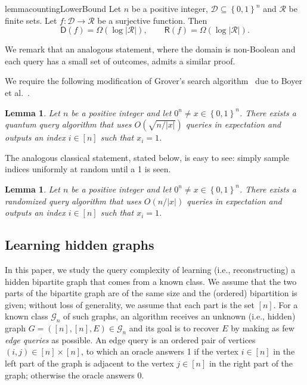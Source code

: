 \documentclass[11pt]{article}
\newcommand{\cD}{\mathcal{D}}
\newcommand{\cG}{\mathcal{G}}
\newcommand{\cR}{\mathcal{R}}
\newcommand{\sD}{\mathsf{D}}
\newcommand{\sR}{\mathsf{R}}
\newcommand{\set}[1]{\left\{ #1 \right\}}
\newcommand{\rbra}[1]{\left(#1\right)}
\newcommand{\zone}{\set{0,1}}
\newtheorem{lemma}[theorem]{Lemma}
\begin{document}
\begin{restatable}{lemma}{countingLowerBound}
\label{lem:large-range-query-lower-bound}
    Let $n$ be a positive integer, $\cD \subseteq \zone^n$ and $\cR$ be finite sets. Let $f : \cD \to \cR$ be a surjective function.
    Then
    \[
    \sD(f) = \Omega\rbra{\log|\cR|}, \qquad \sR(f) = \Omega\rbra{\log|\cR|}.
    \]
\end{restatable}

We remark that an analogous statement, where the domain is non-Boolean and each query has a small set of outcomes, admits a similar proof.

We require the following modification of Grover's search algorithm~\cite{Grover96} due to Boyer et al.~\cite{BBHT98}.

\begin{lemma}\label{lem:bbht}
    Let $n$ be a positive integer and let $0^n \neq x \in \zone^n$. There exists a quantum query algorithm that uses $O(\sqrt{n/|x|})$ queries in expectation and outputs an index $i \in [n]$ such that $x_i = 1$.
\end{lemma}
The analogous classical statement, stated below, is easy to see: simply sample indices uniformly at random until a 1 is seen.
\begin{lemma}\label{lem:sample}
    Let $n$ be a positive integer and let $0^n \neq x \in \zone^n$. There exists a randomized query algorithm that uses $O(n/|x|)$ queries in expectation and outputs an index $i \in [n]$ such that $x_i = 1$.
\end{lemma}

\subsection{Learning hidden graphs}
In this paper, we study the query complexity of learning (i.e., reconstructing) a hidden bipartite graph that comes from a known class. We assume that the two parts of the bipartite graph are of the same size and the (ordered) bipartition is given; without loss of generality, we assume that each part is the set $[n]$. For a known class $\cG_n$ of such graphs, an algorithm receives an unknown (i.e., hidden) graph $G=([n],[n],E) \in \cG_n$ and its goal is to recover $E$ by making as few \emph{edge queries} as possible. An edge query is an ordered pair of vertices $(i,j) \in [n] \times [n]$, to which an oracle answers 1 if the vertex $i \in[n]$ in the left part of the graph is adjacent to the vertex $j \in[n]$ in the right part of the graph; otherwise the oracle answers 0.
\end{document}
